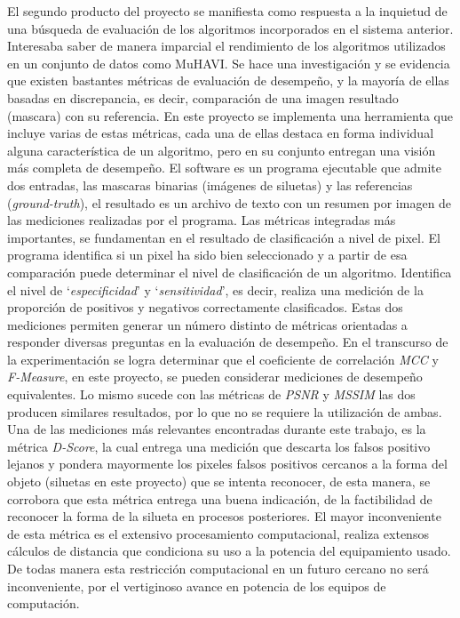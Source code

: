 El segundo producto del proyecto se manifiesta como respuesta a la inquietud de una búsqueda de evaluación de los algoritmos incorporados en el sistema anterior. Interesaba saber de manera imparcial el rendimiento de los algoritmos utilizados en un conjunto de datos como MuHAVI. Se hace una investigación y se evidencia que existen bastantes métricas de evaluación de desempeño, y la mayoría de ellas basadas en discrepancia, es decir, comparación de una imagen resultado (mascara) con su referencia. En este proyecto se implementa una herramienta que incluye varias de estas métricas, cada una de ellas destaca en forma individual alguna característica de un algoritmo, pero en su conjunto entregan una visión más completa de desempeño. El software es un programa ejecutable que admite dos entradas, las mascaras binarias (imágenes de siluetas) y las referencias (\textit{ground-truth}), el resultado es un archivo de texto con un resumen por imagen de las mediciones realizadas por el programa. Las métricas integradas más importantes, se fundamentan en el resultado de clasificación a nivel de pixel. El programa identifica si un pixel ha sido bien seleccionado y a partir de esa comparación puede determinar el nivel de clasificación de un algoritmo. Identifica el nivel de `\textit{especificidad}' y `\textit{sensitividad}', es decir, realiza una medición de la proporción de positivos y negativos correctamente clasificados. Estas dos mediciones permiten generar un número distinto de métricas orientadas a responder diversas preguntas en la evaluación de desempeño. En el transcurso de la experimentación se logra determinar que el coeficiente de correlación \textit{MCC} y \textit{F-Measure}, en este proyecto, se pueden considerar mediciones de desempeño equivalentes. Lo mismo sucede con las métricas de \textit{PSNR} y \textit{MSSIM} las dos producen similares resultados, por lo que no se requiere la utilización de ambas. Una de las mediciones más relevantes encontradas durante este trabajo, es la métrica \textit{D-Score}, la cual entrega una medición que descarta los falsos positivo lejanos y pondera mayormente los pixeles falsos positivos cercanos a la forma del objeto (siluetas en este  proyecto) que se intenta reconocer, de esta manera, se corrobora que esta métrica entrega una buena indicación, de la factibilidad de reconocer la forma de la silueta en procesos posteriores. El mayor inconveniente de esta métrica es el extensivo procesamiento computacional, realiza extensos cálculos de distancia que condiciona su uso a la potencia del equipamiento usado. De todas manera esta restricción computacional en un futuro cercano no será inconveniente, por el vertiginoso avance en potencia de los equipos de computación.

